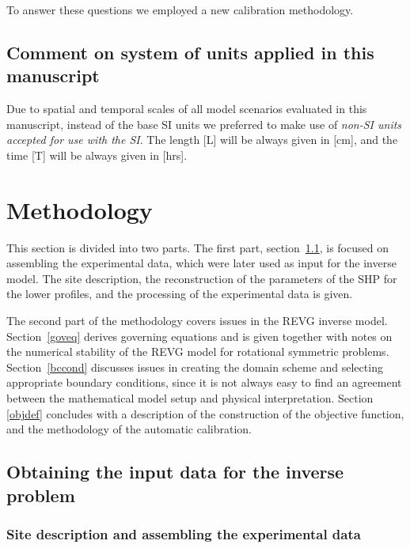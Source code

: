 \documentclass[review,times,3p,10pt]{elsarticle}
\begin{document}
To answer these questions we employed a new calibration methodology. 




\subsection{Comment on system of units applied in this manuscript}

Due to spatial and temporal scales of all model scenarios evaluated in this manuscript, instead of the base SI units we preferred to make use of {\it non-SI units  accepted for use with the SI}. The length [L] will be always given in [cm], and the time [T] will be always given in [hrs].






\section{Methodology}%
\label{metodo}


This section is divided into two parts. The first part, section~\ref{assamb}, is focused on assembling the experimental data, which were later used as input for the inverse model. The site description, the reconstruction of the parameters of the SHP for the lower profiles, and the processing of the experimental data is given.   

The second part of the methodology covers issues in the REVG inverse model. Section~\ref{goveq} derives governing equations and is given together with notes on the numerical stability of the REVG model for rotational symmetric problems.
Section~\ref{bccond} discusses issues in creating the domain scheme and selecting appropriate boundary conditions, since it is not always easy to find an agreement between the mathematical model setup and  physical interpretation. Section \ref{objdef} concludes with a description of the construction of the objective function, and the methodology of the automatic calibration. 



\subsection{Obtaining the input data for the inverse problem}
\label{assamb}


\subsubsection{Site description and assembling the experimental data}%
\label{site}
\end{document}
